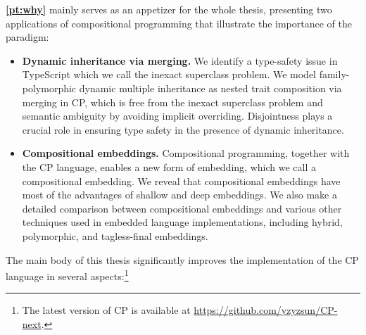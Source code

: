 \textbf{\autoref{pt:why}} mainly serves as an appetizer for the whole thesis,
presenting two applications of compositional programming that illustrate the
importance of the paradigm:
\begin{itemize}
\item \textbf{Dynamic inheritance via merging.} We identify a type-safety issue
      in TypeScript which we call the inexact superclass problem. We model
      family-polymorphic dynamic multiple inheritance as nested trait
      composition via merging in CP, which is free from the inexact superclass
      problem and semantic ambiguity by avoiding implicit overriding.
      Disjointness plays a crucial role in ensuring type safety in the presence
      of dynamic inheritance.
\item \textbf{Compositional embeddings.} Compositional programming, together
      with the CP language, enables a new form of embedding, which we call a
      compositional embedding. We reveal that compositional embeddings have most
      of the advantages of shallow and deep embeddings. We also make a detailed
      comparison between compositional embeddings and various other techniques
      used in embedded language implementations, including hybrid, polymorphic,
      and tagless-final embeddings.
\end{itemize}
The main body of this thesis significantly improves the implementation of the CP
language in several aspects:\footnote{The latest version of CP is available at
\url{https://github.com/yzyzsun/CP-next}.}
